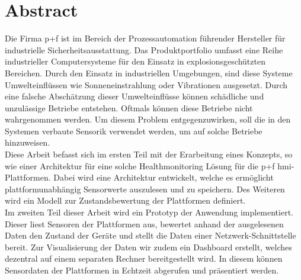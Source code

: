 \chapter*{Abstract}
Die Firma \ac{p+f} ist im Bereich der Prozessautomation führender Hersteller für industrielle Sicherheitsausstattung. Das Produktportfolio umfasst eine Reihe industrieller Computersysteme für den Einsatz in explosionsgeschützten Bereichen. Durch den Einsatz in industriellen Umgebungen, sind diese Systeme Umwelteinflüssen wie Sonneneinstrahlung oder Vibrationen ausgesetzt. Durch eine falsche Abschätzung dieser Umwelteinflüsse können schädliche und unzulässige Betriebe entstehen. Oftmals können diese Betriebe nicht wahrgenommen werden. Um diesem Problem entgegenzuwirken, soll die in den Systemen verbaute Sensorik verwendet werden, um auf solche Betriebe hinzuweisen.\\
Diese Arbeit befasst sich im ersten Teil mit der Erarbeitung eines Konzepts, so wie einer Architektur für eine solche Healthmonitoring Lösung für die \acl{p+f} \ac{hmi}-Plattformen. Dabei wird eine Architektur entwickelt, welche es ermöglicht plattformunabhängig Sensorwerte auszulesen und zu speichern. Des Weiteren wird ein Modell zur Zustandsbewertung der Plattformen definiert.\\
Im zweiten Teil dieser Arbeit wird ein Prototyp der Anwendung implementiert. Dieser liest Sensoren der Plattformen aus, bewertet anhand der ausgelesenen Daten den Zustand der Geräte und stellt die Daten einer Netzwerk-Schnittstelle bereit.
Zur Visualisierung der Daten wir zudem ein Dashboard erstellt, welches dezentral auf einem separaten Rechner bereitgestellt wird. In diesem können Sensordaten der Plattformen in Echtzeit abgerufen und präsentiert werden. 